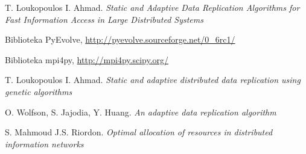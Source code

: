 \documentclass[11pt,pdftex,a4paper]{scrartcl}
\begin{document}
\begin{thebibliography}{}

  T. Loukopoulos I. Ahmad.
  \emph{Static and Adaptive Data Replication Algorithms for Fast Information Access in 
    Large Distributed Systems}

  Biblioteka PyEvolve,
  \url{http://pyevolve.sourceforge.net/0_6rc1/}

  Biblioteka mpi4py,
  \url{http://mpi4py.scipy.org/}
  
  T. Loukopoulos I. Ahmad.
  \emph{Static and adaptive distributed data replication using genetic algorithms}

  O. Wolfson, S. Jajodia, Y. Huang.
  \emph{An adaptive data replication
algorithm}

  S. Mahmoud J.S. Riordon.
  \emph{Optimal allocation of resources in
distributed information networks}



\end{thebibliography}
\end{document}
